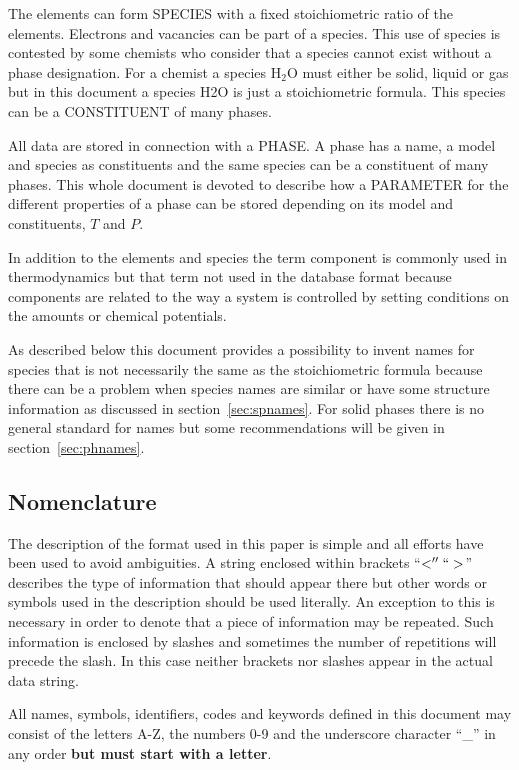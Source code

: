 \documentclass[12pt]{article}
\begin{document}
The elements can form SPECIES with a fixed stoichiometric ratio of the
elements.  Electrons and vacancies can be part of a species.  This use
of species is contested by some chemists who consider that a species
cannot exist without a phase designation.  For a chemist a species
H$_2$O must either be solid, liquid or gas but in this document a
species H2O is just a stoichiometric formula.  This species can be a
CONSTITUENT of many phases.

All data are stored in connection with a PHASE.  A phase has a name, a
model and species as constituents and the same species can be a
constituent of many phases.  This whole document is devoted to
describe how a PARAMETER for the different properties of a phase can
be stored depending on its model and constituents, $T$ and $P$.

In addition to the elements and species the term component is commonly
used in thermodynamics but that term not used in the database format
because components are related to the way a system is controlled by
setting conditions on the amounts or chemical potentials.

As described below this document provides a possibility to invent
names for species that is not necessarily the same as the
stoichiometric formula because there can be a problem when species
names are similar or have some structure information as discussed in
section~\ref{sec:spnames}.  For solid phases there is no general
standard for names but some recommendations will be given in
section~\ref{sec:phnames}.

\subsection{Nomenclature}

The description of the format used in this paper is simple and all
efforts have been used to avoid ambiguities.  A string enclosed within
brackets ``$<'' ``>$'' describes the type of information that should
appear there but other words or symbols used in the description should
be used literally.  An exception to this is necessary in order to
denote that a piece of information may be repeated.  Such information
is enclosed by slashes and sometimes the number of repetitions will
precede the slash.  In this case neither brackets nor slashes appear
in the actual data string.

All names, symbols, identifiers, codes and keywords defined in this
document may consist of the letters A-Z, the numbers 0-9 and the
underscore character ``\_'' in any order {\bf but must start with a
  letter}.  
\end{document}

